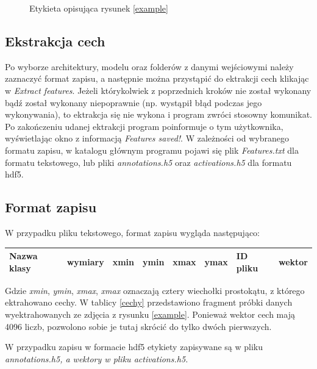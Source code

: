 \documentclass[a4paper,twoside,12pt]{book}
\begin{document}
{\begin{figure}
\begin{lstlisting}
\end{lstlisting}
\caption{Etykieta opisująca rysunek \ref{example}}
\label{etykieta}
\end{figure}
\subsection{Ekstrakcja cech}
{Po wyborze architektury, modelu oraz folderów z danymi wejściowymi należy zaznaczyć format zapisu, a następnie można przystąpić do ektrakcji cech klikając w \emph{Extract features}. Jeżeli którykolwiek z poprzednich kroków nie został wykonany bądź został wykonany niepoprawnie (np. wystąpił błąd podczas jego wykonywania), to ektrakcja się nie wykona i program zwróci stosowny komunikat. Po zakończeniu udanej ektrakcji program poinformuje o tym użytkownika, wyświetlając okno z informacją \emph{Features saved!}. W zależności od wybranego formatu zapisu, w katalogu głównym programu pojawi się plik \emph{Features.txt} dla formatu tekstowego, lub pliki \emph{annotations.h5} oraz  \emph{activations.h5} dla formatu hdf5. }
\subsection{Format zapisu}
{W przypadku pliku tekstowego, format zapisu wygląda następująco:}

\begin{table}[h!]
\centering
\begin{tabular}{|l|l|l|l|l|l|l|l|}
\hline
Nazwa klasy & wymiary & xmin & ymin & xmax & ymax & ID pliku & wektor \\
\hline

\end{tabular}
\end{table}  
{Gdzie \emph{xmin}, \emph{ymin}, \emph{xmax}, \emph{xmax} oznaczają cztery wiechołki prostokątu, z którego ektrahowano cechy. W tablicy \ref{cechy} przedstawiono fragment próbki danych wyektrahowanych ze zdjęcia z rysunku \ref{example}. Ponieważ wektor cech mają 4096 liczb, pozwolono sobie je tutaj skrócić do tylko dwóch pierwszych.}
{W przypadku zapisu w formacie hdf5 etykiety zapisywane są w pliku \emph{annotations.h5, a wektory w pliku \emph{activations.h5}.}
\label{format}



}}
\end{document}
